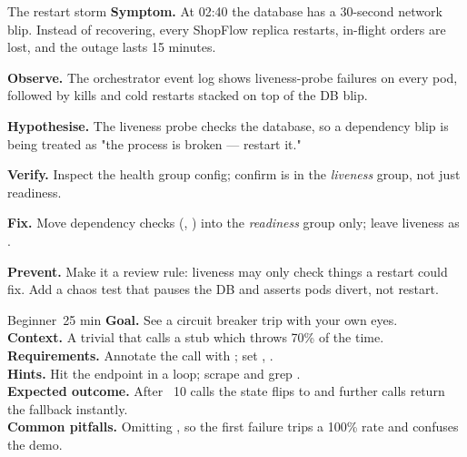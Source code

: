 \begin{debuglab}{The restart storm}
\textbf{Symptom.} At 02:40 the database has a 30-second network blip. Instead of recovering, every ShopFlow replica restarts, in-flight orders are lost, and the outage lasts 15 minutes.

\begin{tickcheck}
  \item \textbf{Observe.} The orchestrator event log shows liveness-probe failures on every pod, followed by kills and cold restarts stacked on top of the DB blip.
  \item \textbf{Hypothesise.} The liveness probe checks the database, so a dependency blip is being treated as "the process is broken --- restart it."
  \item \textbf{Verify.} Inspect the health group config; confirm  is in the \emph{liveness} group, not just readiness.
  \item \textbf{Fix.} Move dependency checks (, ) into the \emph{readiness} group only; leave liveness as .
  \item \textbf{Prevent.} Make it a review rule: liveness may only check things a restart could fix. Add a chaos test that pauses the DB and asserts pods divert, not restart.
\end{tickcheck}
\end{debuglab}


\begin{minilab}{Beginner}{~25 min}
\textbf{Goal.} See a circuit breaker trip with your own eyes.\\
\textbf{Context.} A trivial  that calls a stub which throws 70\% of the time.\\
\textbf{Requirements.} Annotate the call with ; set , .\\
\textbf{Hints.} Hit the endpoint in a loop; scrape  and grep .\\
\textbf{Expected outcome.} After ~10 calls the state flips to  and further calls return the fallback instantly.\\
\textbf{Common pitfalls.} Omitting , so the first failure trips a 100\% rate and confuses the demo.
\end{minilab}

